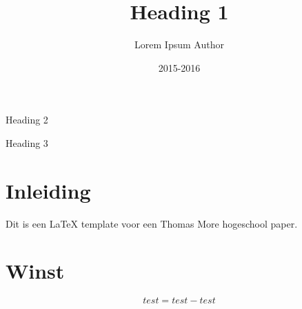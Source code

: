 \documentclass[11pt, a4paper, oneside]{book}
\title{Heading 1}
\date{2015-2016}
\author{Lorem Ipsum Author}
\begin{document}
	\begin{titlepage}
				\vspace*{130mm}
				\begin{flushright}
				\bf
				\color{oranjerood}
				{
					\scshape	
					\huge
					\selectfont
					\thetitle
				}
				
				\vspace{0mm}
				\LARGE
				Heading 2
				\end{flushright}
				\vspace{\fill}
				{\color{blauwgroen} Heading 3}
				
				\newpage

	\end{titlepage}

\tableofcontents

\newpage




\chapter{Inleiding}

Dit is een LaTeX template voor een Thomas More hogeschool paper.

\newpage

\chapter{Winst}

	\begin{mdframed}[backgroundcolor=grijs!40,shadow=false,roundcorner=8pt]
		$$test = test - test$$
	\end{mdframed}
\end{document}

